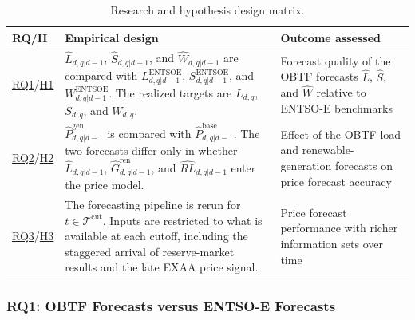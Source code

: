 \begin{table}[H]
  \centering
  \small
  \caption[Mapping of RQs and hypotheses to empirical designs.]
  {Research and hypothesis design matrix.}
  \label{tab:rq_experiment_mapping}
  \begin{tabular}{@{}>{\raggedright\arraybackslash}p{}
                  >{\raggedright\arraybackslash}p{}
                  >{\raggedright\arraybackslash}p{}@{}}
    \toprule
    RQ/H & Empirical design & Outcome assessed \\
    \midrule
    \hyperlink{rq:component_forecast_quality}{RQ1}/\hyperlink{hyp:component_forecast_quality}{H1}
    & \(\hat{L}_{d,q|d-1}\), \(\hat{S}_{d,q|d-1}\), and
      \(\hat{W}_{d,q|d-1}\) are compared with
      \(L^{\mathrm{ENTSOE}}_{d,q|d-1}\),
      \(S^{\mathrm{ENTSOE}}_{d,q|d-1}\), and
      \(W^{\mathrm{ENTSOE}}_{d,q|d-1}\). The realized targets are
      \(L_{d,q}\), \(S_{d,q}\), and \(W_{d,q}\).
    & Forecast quality of the OBTF forecasts \(\hat{L}\), \(\hat{S}\), and
      \(\hat{W}\) relative to \mbox{ENTSO-E} benchmarks \\
    \addlinespace
    \hyperlink{rq:price_impact_generated_forecasts}{RQ2}/\hyperlink{hyp:price_impact_generated_forecasts}{H2}
    & \(\hat{P}^{\mathrm{gen}}_{d,q|d-1}\) is compared with
      \(\hat{P}^{\mathrm{base}}_{d,q|d-1}\). The two forecasts differ only in
      whether \(\hat{L}_{d,q|d-1}\), \(\hat{G}^{\mathrm{ren}}_{d,q|d-1}\), and
      \(\widehat{RL}_{d,q|d-1}\) enter the price model.
    & Effect of the OBTF load and renewable-generation forecasts on price
      forecast accuracy \\
    \addlinespace
    \hyperlink{rq:cutoff_sensitivity}{RQ3}/\hyperlink{hyp:cutoff_sensitivity}{H3}
    & The forecasting pipeline is rerun for
      \(t \in \mathcal{T}^{\mathrm{cut}}\). Inputs are restricted to what is
      available at each cutoff, including the staggered arrival of
      reserve-market results and the late EXAA price signal.
    & Price forecast performance with richer information sets over time \\
    \bottomrule
  \end{tabular}
\end{table}

\FloatBarrier

\subsubsection{RQ1: OBTF Forecasts versus \mbox{ENTSO-E} Forecasts}
\label{sec:rq1_component_forecast_benchmarking}


